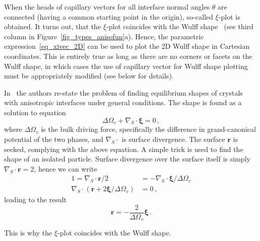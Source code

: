 When the heads of capillary vectors for all interface normal angles $\theta$ are connected (having a common starting point in the origin), so-called $\xi$-plot is obtained. It turns out, that the $\xi$-plot coincides with the Wulff shape~\cite{Hoffman1972, Kobayashi2001} (see third column in Figure~\ref{fig_types_anisofun}a). Hence, the parametric expression~\eqref{eq_xivec_2D} can be used to plot the 2D Wulff shape in Cartesian coordinates. This is entirely true as long as there are no corners or facets on the Wulff shape, in which cases the use of capillary vector for Wulff shape plotting must be appropriately modified (see below for details).

In~\cite{Cahn1974} the authors re-state the problem of finding equilibrium shapes of crystals with anisotropic interfaces under general conditions. The shape is found as a solution to equation
\begin{equation} \label{eq_xivec_equilibrium_shape}
    \Delta\Omega_v + \nabla_S\cdot \bm{\xi} = 0 \,,
\end{equation}
where $\Delta\Omega_v$ is the bulk driving force, specifically the difference in grand-canonical potential of the two phases, and $\nabla_S\cdot$ is surface divergence. The surface $\bm{r}$ is seeked, complying with the above equation. A simple trick is used to find the shape of an isolated particle. Surface divergence over the surface itself is simply $\nabla_S\cdot\bm{r}=2$, hence we can write
\begin{align}
    1 = \nabla_S\cdot\bm{r}/2 &= -\nabla_S\cdot\bm{\xi}/\Delta\Omega_v \\
     \nabla_S\cdot(\bm{r} +2\bm{\xi}/\Delta\Omega_v) &=0 \,,
\end{align}
leading to the result
\begin{equation}
    \bm{r} = -\frac{2}{\Delta\Omega_v}\bm{\xi} \,.
\end{equation}

This is why the $\xi$-plot coincides with the Wulff shape.

